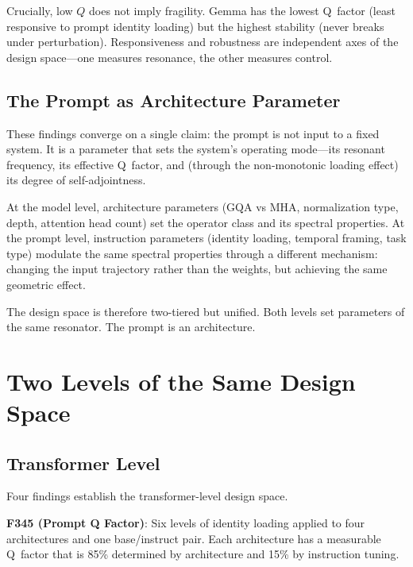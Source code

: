 \documentclass[12pt]{article}
\begin{document}
Crucially, low $Q$ does not imply fragility. Gemma has the lowest Q~factor (least responsive to prompt identity loading) but the highest stability (never breaks under perturbation). Responsiveness and robustness are independent axes of the design space---one measures resonance, the other measures control.

\subsection{The Prompt as Architecture Parameter}

These findings converge on a single claim: the prompt is not input to a fixed system. It is a parameter that sets the system's operating mode---its resonant frequency, its effective Q~factor, and (through the non-monotonic loading effect) its degree of self-adjointness.

At the model level, architecture parameters (GQA vs MHA, normalization type, depth, attention head count) set the operator class and its spectral properties. At the prompt level, instruction parameters (identity loading, temporal framing, task type) modulate the same spectral properties through a different mechanism: changing the input trajectory rather than the weights, but achieving the same geometric effect.

The design space is therefore two-tiered but unified. Both levels set parameters of the same resonator. The prompt is an architecture.

\section{Two Levels of the Same Design Space}
\label{sec:twolevels}

\subsection{Transformer Level}

Four findings establish the transformer-level design space.

\textbf{F345 (Prompt Q Factor)}: Six levels of identity loading applied to four architectures and one base/instruct pair. Each architecture has a measurable Q~factor that is 85\% determined by architecture and 15\% by instruction tuning.
\end{document}
